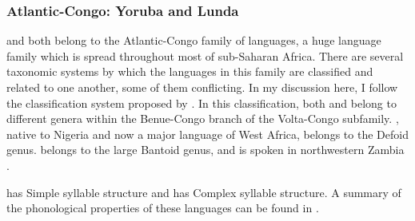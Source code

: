 \subsubsection{{Atlantic-Congo:} {Yoruba} {and} {Lunda}}\label{sec:8.4.3.4}

   and  both belong to the Atlantic-Congo family of languages, a huge language family which is spread throughout most of sub-Saharan Africa. There are several taxonomic systems by which the languages in this family are classified and related to one another, some of them conflicting. In my discussion here, I follow the classification system proposed by \citet{Williamson1989}. In this classification, both  and  belong to different genera within the Benue-Congo branch of the Volta-Congo subfamily. , native to Nigeria and now a major language of West Africa, belongs to the Defoid genus.  belongs to the large Bantoid genus, and is spoken in northwestern Zambia \citep{Kawasha2003}.

   has Simple syllable structure and  has Complex syllable structure. A summary of the phonological properties of these languages can be found in .

